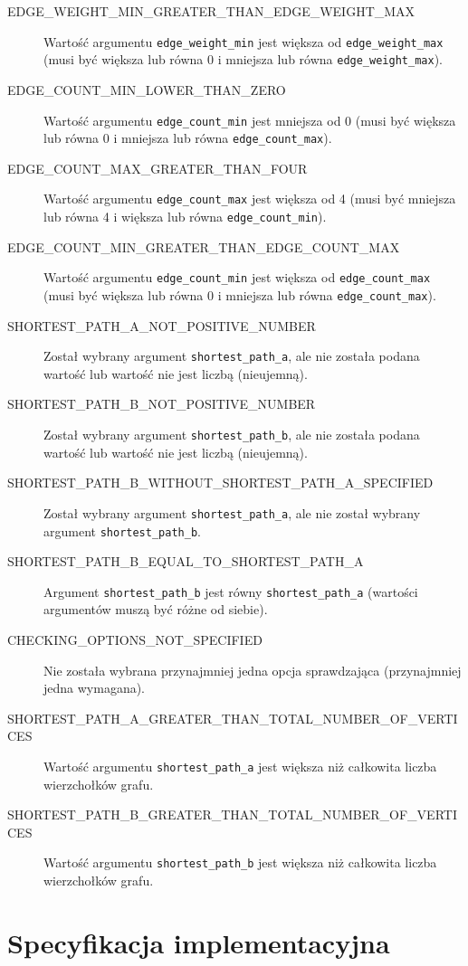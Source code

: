 \documentclass[11pt,a4paper]{report}
\begin{document}
\begin{description}
        \item[EDGE\_WEIGHT\_MIN\_GREATER\_THAN\_EDGE\_WEIGHT\_MAX] Wartość argumentu \verb|edge_weight_min| jest większa od \verb|edge_weight_max| (musi być większa lub równa 0 i mniejsza lub równa \verb|edge_weight_max|).
        \item[EDGE\_COUNT\_MIN\_LOWER\_THAN\_ZERO] Wartość argumentu \verb|edge_count_min| jest mniejsza od 0 (musi być większa lub równa 0 i mniejsza lub równa \verb|edge_count_max|).
        \item[EDGE\_COUNT\_MAX\_GREATER\_THAN\_FOUR] Wartość argumentu \verb|edge_count_max| jest większa od 4 (musi być mniejsza lub równa 4 i większa lub równa \verb|edge_count_min|).
        \item[EDGE\_COUNT\_MIN\_GREATER\_THAN\_EDGE\_COUNT\_MAX] Wartość argumentu \verb|edge_count_min| jest większa od \verb|edge_count_max| (musi być większa lub równa 0 i mniejsza lub równa \verb|edge_count_max|).
        \item[SHORTEST\_PATH\_A\_NOT\_POSITIVE\_NUMBER] Został wybrany argument \verb|shortest_path_a|, ale nie została podana wartość lub wartość nie jest liczbą (nieujemną).
        \item[SHORTEST\_PATH\_B\_NOT\_POSITIVE\_NUMBER] Został wybrany argument \verb|shortest_path_b|, ale nie została podana wartość lub wartość nie jest liczbą (nieujemną).
        \item[SHORTEST\_PATH\_B\_WITHOUT\_SHORTEST\_PATH\_A\_SPECIFIED] Został wybrany argument \verb|shortest_path_a|, ale nie został wybrany argument \verb|shortest_path_b|.
        \item[SHORTEST\_PATH\_B\_EQUAL\_TO\_SHORTEST\_PATH\_A] Argument \verb|shortest_path_b| jest równy \verb|shortest_path_a| (wartości argumentów muszą być różne od siebie).
        \item[CHECKING\_OPTIONS\_NOT\_SPECIFIED] Nie została wybrana przynajmniej jedna opcja sprawdzająca (przynajmniej jedna wymagana).
        \item[SHORTEST\_PATH\_A\_GREATER\_THAN\_TOTAL\_NUMBER\_OF\_VERTICES] Wartość argumentu \verb|shortest_path_a| jest większa niż całkowita liczba wierzchołków grafu.
        \item[SHORTEST\_PATH\_B\_GREATER\_THAN\_TOTAL\_NUMBER\_OF\_VERTICES] Wartość argumentu \verb|shortest_path_b| jest większa niż całkowita liczba wierzchołków grafu. 
    \end{description}


    \chapter{Specyfikacja implementacyjna}
\end{document}

